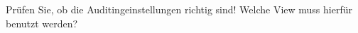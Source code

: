     \item Pr\"ufen Sie, ob die Auditingeinstellungen richtig sind! Welche View muss hierf\"ur benutzt werden?
